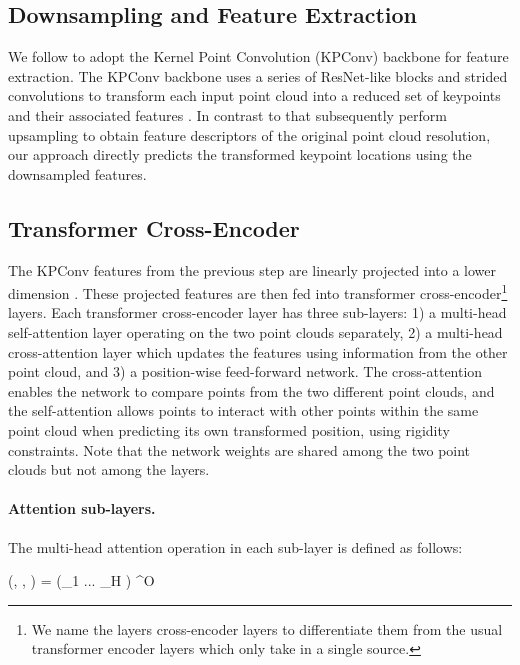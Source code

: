 \documentclass[10pt,twocolumn,letterpaper]{article}
\begin{document}
\subsection{Downsampling and Feature Extraction}\label{sect:feat-extract}
We follow \cite{bai2020d3feat,huang2021predator} to adopt the Kernel Point Convolution (KPConv) \cite{thomas2019kpconv} backbone for feature extraction. 
The KPConv backbone uses a series of ResNet-like blocks and strided convolutions to transform each input point cloud into a reduced set of keypoints  and their associated features .
In contrast to \cite{bai2020d3feat, huang2021predator} that subsequently perform upsampling to obtain feature descriptors of the original point cloud resolution, our approach directly predicts the transformed keypoint locations using the downsampled features.

\subsection{Transformer Cross-Encoder}\label{sect:transformer-layers}


The KPConv features from the previous step are linearly projected into a lower dimension . These projected features are then fed into  transformer cross-encoder\footnote{We name the layers cross-encoder layers to differentiate them from the usual transformer encoder layers \cite{vaswani2017attention} which only take in a single source.} layers. Each transformer cross-encoder layer has three sub-layers: 1) a multi-head self-attention layer operating on the two point clouds separately, 2) a multi-head cross-attention layer which updates the features using information from the other point cloud, and 3) a position-wise feed-forward network.
The cross-attention enables the network to compare points from the two different point clouds, and the self-attention allows points to interact with other points within the same point cloud when predicting its own transformed position, \eg using rigidity constraints.
Note that the network weights are shared among the two point clouds but not among the layers.

\vspace{-3mm}
\paragraph{Attention sub-layers.} The multi-head attention \cite{vaswani2017attention} operation in each sub-layer is defined as follows:

    (, , ) = 
    \left
        (_1 \oplus ... \oplus {}_H
    \right) ^O
\end{document}
